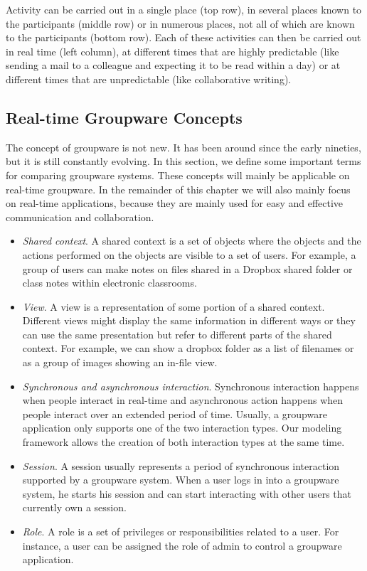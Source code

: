Activity can be carried out in a single place (top row), in several places known to the participants (middle row) or in numerous places, not all of which are known to the participants (bottom row). Each of these activities can then be carried out in real time (left column), at different times that are highly predictable (like sending a mail to a colleague and expecting it to be read within a day) or at different times that are unpredictable (like collaborative writing).

\subsection{Real-time Groupware Concepts}

The concept of groupware is not new. It has been around since the early nineties, but it is still constantly evolving. In this section, we define some important terms for comparing groupware systems. These concepts will mainly be applicable on real-time groupware. In the remainder of this chapter we will also mainly focus on real-time applications, because they are mainly used for easy and effective communication and collaboration.

\begin{itemize}
\item{\textit{Shared context}. A shared context is a set of objects where the objects and the actions performed on the objects are visible to a set of users. For example, a group of users can make notes on files shared in a Dropbox shared folder or class notes within electronic classrooms.}
\item{\textit{View}. A view is a representation of some portion of a shared context. Different views might display the same information in different ways or they can use the same presentation but refer to different parts of the shared context. For example, we can show a dropbox folder as a list of filenames or as a group of images showing an in-file view.}
\item{\textit{Synchronous and asynchronous interaction}. Synchronous interaction happens when people interact in real-time and asynchronous action happens when people interact over an extended period of time. Usually, a groupware application only supports one of the two interaction types. Our modeling framework allows the creation of both interaction types at the same time.}
\item{\textit{Session}. A session usually represents a period of synchronous interaction supported by a groupware system. When a user logs in into a groupware system, he starts his session and can start interacting with other users that currently own a session.}
\item{\textit{Role}. A role is a set of privileges or responsibilities related to a user. For instance, a user can be assigned the role of admin to control a groupware application.}
\end{itemize}

